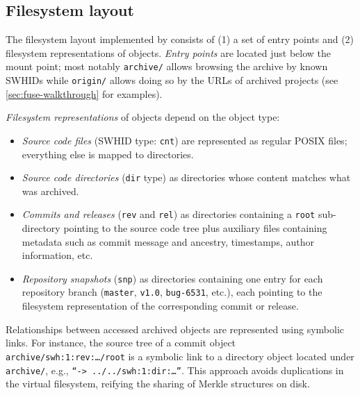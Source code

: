 \subsection{Filesystem layout}

The filesystem layout implemented by \SWHFSpy{} consists of (1) a set of entry
points and (2) filesystem representations of \SWH{} objects. \emph{Entry points}
are located just below the \SWHFS{} mount point; most notably \texttt{archive/}
allows browsing the \SWH{} archive by known SWHIDs while \texttt{origin/} allows
doing so by the URLs of archived projects (see \cref{sec:fuse-walkthrough}
for examples).

\emph{Filesystem representations} of \SWH{} objects depend on the object type:
\begin{itemize}

\item \emph{Source code files} (SWHID type: \texttt{cnt}) are represented as
  regular POSIX files; everything else is mapped to directories.

\item \emph{Source code directories} (\texttt{dir} type) as directories whose
  content matches what was archived.

\item \emph{Commits and releases} (\texttt{rev} and \texttt{rel}) as
  directories containing a \texttt{root} sub-directory pointing to the source
  code tree plus auxiliary files containing metadata such as commit message and
  ancestry, timestamps, author information, etc.

\item \emph{Repository snapshots} (\texttt{snp}) as directories containing one
  entry for each repository branch (\texttt{master}, \texttt{v1.0},
  \texttt{bug-6531}, etc.), each pointing to the filesystem representation of
  the corresponding commit or release.

\end{itemize}

Relationships between accessed archived objects are represented using symbolic
links. For instance, the source tree of a commit object
\texttt{archive/swh:1:rev:…/root} is a symbolic link to a directory object
located under \texttt{archive/}, e.g., \texttt{``->~../../swh:1:dir:…''}. This
approach avoids duplications in the virtual filesystem, reifying the sharing of
Merkle structures on disk.

